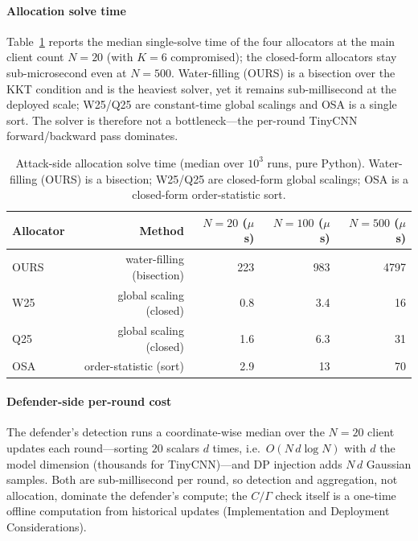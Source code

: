 \documentclass[final,1p,times]{elsarticle}
\begin{document}
\paragraph{Allocation solve time}
Table~\ref{tab:overhead} reports the median single-solve time of the four
allocators at the main client count $N{=}20$ (with $K{=}6$
compromised); the closed-form allocators stay sub-microsecond even at
$N{=}500$. Water-filling (OURS)
is a bisection over the KKT condition and is the heaviest solver, yet it
remains sub-millisecond at the deployed scale; W25/Q25 are constant-time
global scalings and OSA is a single sort. The solver is therefore not a
bottleneck---the per-round TinyCNN forward/backward pass dominates.

\begin{table}[!t]
\centering
\caption{Attack-side allocation solve time (median over $10^3$ runs, pure
Python). Water-filling (OURS) is a bisection; W25/Q25 are closed-form
global scalings; OSA is a closed-form order-statistic sort.}
\label{tab:overhead}
\footnotesize\setlength{\tabcolsep}{4pt}
\begin{tabular}{lrrrr}
\toprule
Allocator & Method & $N{=}20$ ($\mu$s) & $N{=}100$ ($\mu$s) & $N{=}500$ ($\mu$s) \\
\midrule
OURS & water-filling (bisection) & 223 & 983 & 4797 \\
W25  & global scaling (closed)   & 0.8 & 3.4 & 16 \\
Q25  & global scaling (closed)   & 1.6 & 6.3 & 31 \\
OSA  & order-statistic (sort)    & 2.9 & 13  & 70 \\
\bottomrule
\end{tabular}
\end{table}

\paragraph{Defender-side per-round cost}
The defender's detection runs a coordinate-wise median over the $N{=}20$
client updates each round---sorting $20$ scalars $d$ times, i.e.\
$O(N\,d\log N)$ with $d$ the model dimension (thousands for TinyCNN)---and
DP injection adds $N\,d$ Gaussian samples. Both are sub-millisecond per
round, so detection and aggregation, not allocation, dominate the
defender's compute; the $C/\Gamma$ check itself is a one-time offline
computation from historical updates (Implementation and Deployment
Considerations).

\end{document}
